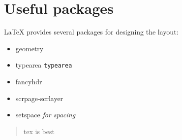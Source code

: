 \documentclass{article}
\begin{document}
\section{Useful packages}
LaTeX provides several packages for designing the layout:
\begin{itemize}
  \item geometry
  \item typearea \texttt{typearea}
  \item fancyhdr
  \item scrpage-scrlayer
  \item setspace \textit{for spacing}
\end{itemize}
\begin{quotation}tex is best\end{quotation}
\end{document}
